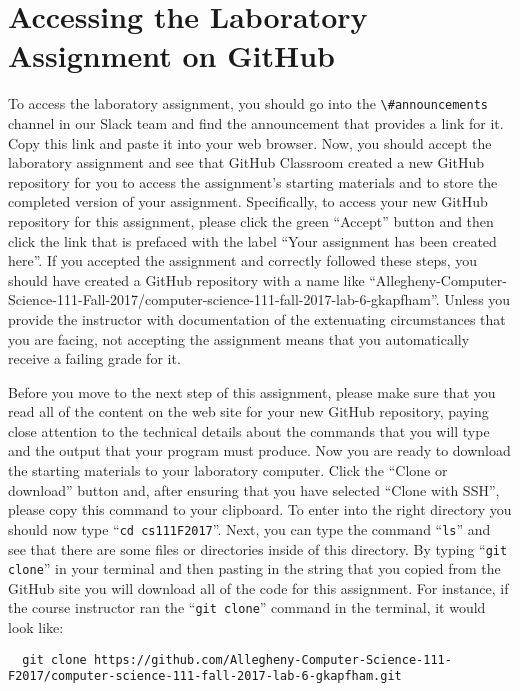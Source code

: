 \documentclass[11pt]{article}
\newcommand{\command}[1]{``\lstinline{#1}''}
\newcommand{\channel}[1]{\lstinline{#1}}
\begin{document}
\section*{Accessing the Laboratory Assignment on GitHub}

To access the laboratory assignment, you should go into the \channel{\#announcements} channel in our Slack team and find
the announcement that provides a link for it. Copy this link and paste it into your web browser. Now, you should accept
the laboratory assignment and see that GitHub Classroom created a new GitHub repository for you to access the
assignment's starting materials and to store the completed version of your assignment. Specifically, to access your new
GitHub repository for this assignment, please click the green ``Accept'' button and then click the link that is prefaced
with the label ``Your assignment has been created here''. If you accepted the assignment and correctly followed these
steps, you should have created a GitHub repository with a name like
``Allegheny-Computer-Science-111-Fall-2017/computer-science-111-fall-2017-lab-6-gkapfham''. Unless you provide the
instructor with documentation of the extenuating circumstances that you are facing, not accepting the assignment means
that you automatically receive a failing grade for it.

Before you move to the next step of this assignment, please make sure that you read all of the content on the web site
for your new GitHub repository, paying close attention to the technical details about the commands that you will type
and the output that your program must produce. Now you are ready to download the starting materials to your laboratory
computer. Click the ``Clone or download'' button and, after ensuring that you have selected ``Clone with SSH'', please
copy this command to your clipboard. To enter into the right directory you should now type \command{cd cs111F2017}.
Next, you can type the command \command{ls} and see that there are some files or directories inside of this directory.
By typing \command{git clone} in your terminal and then pasting in the string that you copied from the GitHub site you
will download all of the code for this assignment. For instance, if the course instructor ran the \command{git clone}
command in the terminal, it would look like:

\begin{lstlisting}
  git clone https://github.com/Allegheny-Computer-Science-111-F2017/computer-science-111-fall-2017-lab-6-gkapfham.git
\end{lstlisting}
\end{document}
